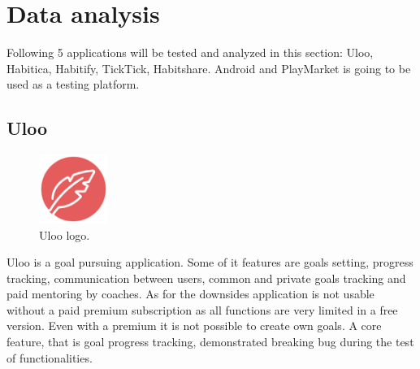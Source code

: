 \section{Data analysis}\label{sec:data-analysis}

Following 5 applications will be tested and analyzed in this section: Uloo, Habitica, Habitify, TickTick, Habitshare.
Android and PlayMarket is going to be used as a testing platform.

\subsection{Uloo}\label{subsec:uloo}

\begin{figure}[h!]
    \includegraphics[width=0.20\textwidth]{images/uloo-logo.png}
    \caption{Uloo logo.\cite{uloo-logo}}
    \label{fig:uloo-logo}
\end{figure}

Uloo is a goal pursuing application.
Some of it features are goals setting, progress tracking, communication between users, common and private goals tracking and paid mentoring by coaches.
As for the downsides application is not usable without a paid premium subscription as all functions are very limited in a free version.
Even with a premium it is not possible to create own goals.
A core feature, that is goal progress tracking, demonstrated breaking bug during the test of functionalities.

